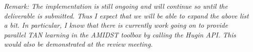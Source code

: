 \emph{Remark: The implementation is still ongoing and will continue so until the deliverable is
  submitted. Thus I expect that we will be able to expand the above list a bit. In particular, I know that
  there is currently work going on to provide parallel TAN learning in the AMIDST toolbox by calling the Hugin
  API. This would also be demonstrated at the review meeting.}  















%

